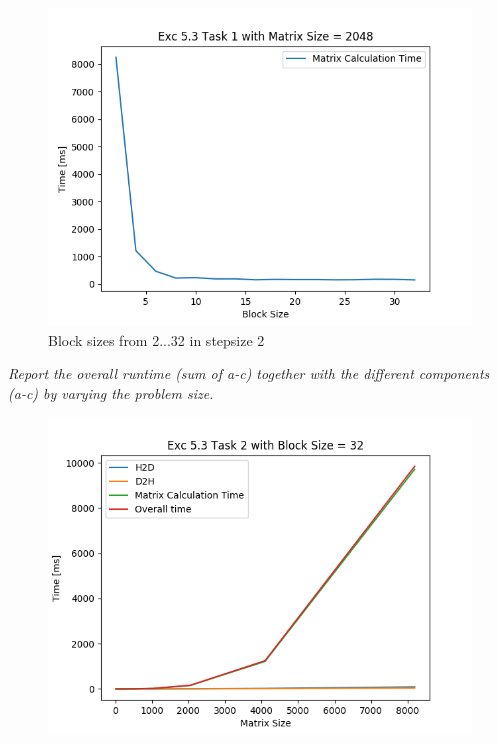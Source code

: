 \documentclass[12pt]{article}
\begin{document}
\begin{figure}[!htb]
	\caption{Block sizes from 2...32 in stepsize 2}
	\includegraphics[scale=0.68]{5_3_01_2048}
	\centering
\end{figure}


\noindent\emph{Report the overall runtime (sum of a-c) together with the different components (a-c) by varying the problem size.}\\

\begin{figure}[!htb]
	\includegraphics[scale=0.75]{5_3_02}
	\centering
\end{figure}
\end{document}
